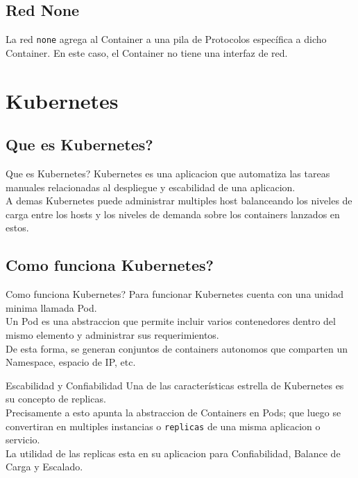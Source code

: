 \documentclass{beamer}
\begin{document}
\subsection{Red None}

\begin{frame}
	La red \texttt{none} agrega al Container a una pila de Protocolos específica a dicho Container. En este caso, el Container no tiene una interfaz de red.
\end{frame}

\section{Kubernetes}

\subsection{Que es Kubernetes?}

\begin{frame}{Que es Kubernetes?}
	Kubernetes es una aplicacion que automatiza las tareas manuales relacionadas al despliegue y escabilidad de una aplicacion. \\
	\vspace{.3cm}
	A demas Kubernetes puede administrar multiples host balanceando los niveles de carga entre los hosts y los niveles de demanda
	sobre los containers lanzados en estos. 
\end{frame}


\subsection{Como funciona Kubernetes?}

\begin{frame}{Como funciona Kubernetes?}
	Para funcionar Kubernetes cuenta con una unidad minima llamada Pod. \\
	\vspace{.2cm}
	Un Pod es una abstraccion que permite incluir varios contenedores dentro del mismo elemento y administrar sus requerimientos. \\
	\vspace{.2cm}
	De esta forma, se generan conjuntos de containers autonomos que comparten un Namespace, espacio de IP, etc.
\end{frame}

\begin{frame}{Escabilidad y Confiabilidad}
	Una de las características estrella de Kubernetes es su concepto de replicas. \\
	\vspace{.3cm}
	Precisamente a esto apunta la abstraccion de Containers en Pods; que luego se convertiran en multiples instancias o \texttt{replicas} de una misma aplicacion
	o servicio. \\
	La utilidad de las replicas esta en su aplicacion para Confiabilidad, Balance de Carga y Escalado.
\end{frame}
\end{document}
